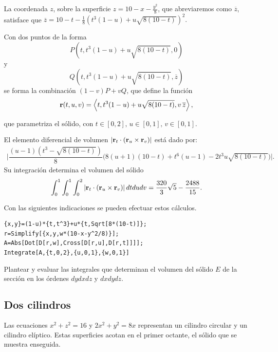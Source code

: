 La coordenada $z$, sobre la superficie $z=10-x-\frac{y^{2}}{8}$,
que abreviaremos como $\overline{z}$, satisface que
{\footnotesize $\overline{z}=10-t-\frac{1}{8}\left( t^{3}(1-u)+u\sqrt{8\left( 10-t\right) }\right) ^{2}$.}

Con dos puntos de la forma
\[P\left( t,t^{3}(1-u)+u\sqrt{8\left( 10-t\right) },0\right) \]
y
\[Q\left( t,t^{3}(1-u)+u\sqrt{8\left( 10-t\right) },\overline{z}\right)\]
se forma la combinación $(1-v) P+vQ$, que define la función
\[{\bf r}(t,u,v)=\left\langle t,t^{3}(1-u)+u\sqrt{8(10-t) },v \,\overline{z} \right\rangle,\]

que parametriza el sólido, con $t\in [0,2],\,u\in [0,1],\,v\in [0,1]$.

El elemento diferencial de volumen
$\left\vert {\bf r}_{t}\cdot \left({\bf r}_{u}\times {\bf r}_{v}\right) \right\vert$ está dado por:
\begin{gather*}
\bigg\vert \dfrac{(u-1)(t^{3}-\sqrt{8(10-t)})}{8}\bigg(8(u+1)(10-t)
+t^6(u-1)-2t^{3}u\sqrt{8(10-t)}\bigg) \bigg\vert.
\end{gather*}
Su integración determina el volumen del sólido
\begin{equation*}
\int_{0}^{1}\int_{0}^{1}\int_{0}^{2}\left\vert {\bf r}_{t}\cdot \left({\bf r}_{u}\times {\bf r}_{v}\right) \right\vert dtdudv=\frac{320}{3}\sqrt{5}-\frac{2488}{15}.
\end{equation*}

Con las siguientes indicaciones se pueden efectuar estos cálculos.

\begin{tcolorbox}[title=\bf Instrucción en \verb"Mathematica"]\begin{Verbatim}[formatcom=\letraverbatim]
{x,y}=(1-u)*{t,t^3}+u*{t,Sqrt[8*(10-t)]};
r=Simplify[{x,y,w*(10-x-y^2/8)}];
A=Abs[Dot[D[r,w],Cross[D[r,u],D[r,t]]]];
Integrate[A,{t,0,2},{u,0,1},{w,0,1}]
\end{Verbatim}
\end{tcolorbox}

\begin{ejer}
Plantear y evaluar las integrales que determinan el volumen del sólido $E$ de la sección 
en los órdenes $dydxdz$ y $dxdydz$.
\end{ejer}

\subsection{Dos cilindros}
Las ecuaciones $x^2+z^2=16$ y $2x^2+y^2=8x$ representan un cilindro circular y un cilindro elíptico. Estas superficies acotan en el primer octante, el sólido que se muestra enseguida.

